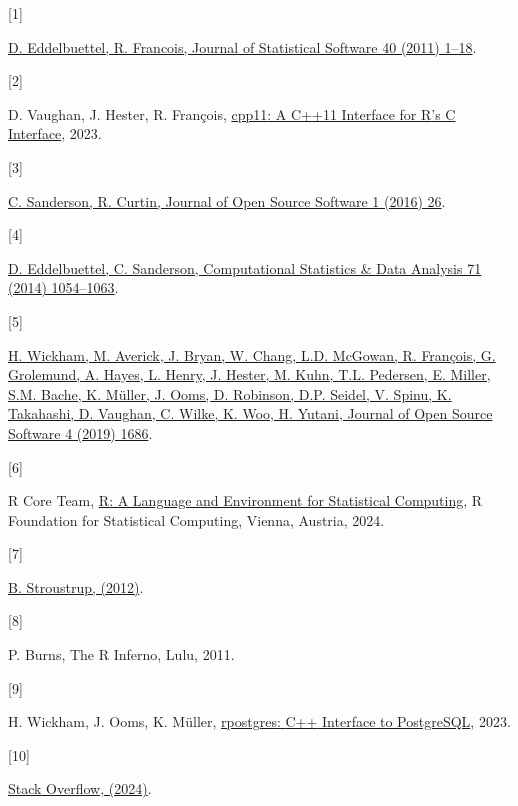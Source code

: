 \documentclass[preprint,12pt, a4paper]{elsarticle}
\newlength{\cslhangindent}
\newlength{\csllabelwidth}
\newenvironment{CSLReferences}[2] %
 {\begin{list}{}{%
  \setlength{\itemindent}{0pt}
  \setlength{\leftmargin}{0pt}
  \setlength{\parsep}{0pt}
  \ifodd #1
   \setlength{\leftmargin}{\cslhangindent}
   \setlength{\itemindent}{-1\cslhangindent}
  \fi
  \setlength{\itemsep}{#2\baselineskip}}}
 {\end{list}}
\newcommand{\CSLLeftMargin}[1]{\parbox[t]{\csllabelwidth}{\strut#1\strut}}
\newcommand{\CSLRightInline}[1]{\parbox[t]{\linewidth - \csllabelwidth}{\strut#1\strut}}
\begin{document}
\label{refs}
\begin{CSLReferences}{0}{0}
\CSLLeftMargin{{[}1{]} }%
\CSLRightInline{\href{https://doi.org/10.18637/jss.v040.i08}{D.
Eddelbuettel, R. Francois, Journal of Statistical Software 40 (2011)
1--18}.}

\CSLLeftMargin{{[}2{]} }%
\CSLRightInline{D. Vaughan, J. Hester, R. François,
\href{https://CRAN.R-project.org/package=cpp11}{{cpp11}: A {C++}11
Interface for {R}'s {C} Interface}, 2023.}

\CSLLeftMargin{{[}3{]} }%
\CSLRightInline{\href{https://doi.org/10.21105/joss.00026}{C. Sanderson,
R. Curtin, Journal of Open Source Software 1 (2016) 26}.}

\CSLLeftMargin{{[}4{]} }%
\CSLRightInline{\href{https://doi.org/10.1016/j.csda.2013.02.005}{D.
Eddelbuettel, C. Sanderson, Computational Statistics \& Data Analysis 71
(2014) 1054--1063}.}

\CSLLeftMargin{{[}5{]} }%
\CSLRightInline{\href{https://doi.org/10.21105/joss.01686}{H. Wickham,
M. Averick, J. Bryan, W. Chang, L.D. McGowan, R. François, G. Grolemund,
A. Hayes, L. Henry, J. Hester, M. Kuhn, T.L. Pedersen, E. Miller, S.M.
Bache, K. Müller, J. Ooms, D. Robinson, D.P. Seidel, V. Spinu, K.
Takahashi, D. Vaughan, C. Wilke, K. Woo, H. Yutani, Journal of Open
Source Software 4 (2019) 1686}.}

\CSLLeftMargin{{[}6{]} }%
\CSLRightInline{R Core Team, \href{https://www.R-project.org/}{{R}: A
Language and Environment for Statistical Computing}, {R} Foundation for
Statistical Computing, Vienna, Austria, 2024.}

\CSLLeftMargin{{[}7{]} }%
\CSLRightInline{\href{https://isocpp.org/tour}{B. Stroustrup, (2012)}.}

\CSLLeftMargin{{[}8{]} }%
\CSLRightInline{P. Burns, The {R} Inferno, Lulu, 2011.}

\CSLLeftMargin{{[}9{]} }%
\CSLRightInline{H. Wickham, J. Ooms, K. Müller,
\href{https://CRAN.R-project.org/package=RPostgres}{{rpostgres}: {C++}
Interface to PostgreSQL}, 2023.}

\CSLLeftMargin{{[}10{]} }%
\CSLRightInline{\href{https://data.stackexchange.com/stackoverflow/query/new}{Stack
Overflow, (2024)}.}


\end{CSLReferences}
\end{document}
